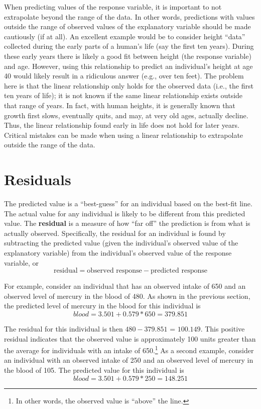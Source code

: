 \documentclass[10pt,openany]{book}\usepackage[]{graphicx}\usepackage[]{color}
\begin{document}
When predicting values of the response variable, it is important to not extrapolate beyond the range of the data. In other words, predictions with values outside the range of observed values of the explanatory variable should be made cautiously (if at all). An excellent example would be to consider height ``data'' collected during the early parts of a human's life (say the first ten years). During these early years there is likely a good fit between height (the response variable) and age. However, using this relationship to predict an individual's height at age 40 would likely result in a ridiculous answer (e.g., over ten feet). The problem here is that the linear relationship only holds for the observed data (i.e., the first ten years of life); it is not known if the same linear relationship exists outside that range of years. In fact, with human heights, it is generally known that growth first slows, eventually quits, and may, at very old ages, actually decline. Thus, the linear relationship found early in life does not hold for later years. Critical mistakes can be made when using a linear relationship to extrapolate outside the range of the data.

\section{Residuals}
The predicted value is a ``best-guess'' for an individual based on the best-fit line. The actual value for any individual is likely to be different from this predicted value. The \textbf{residual} is a measure of how ``far off'' the prediction is from what is actually observed. Specifically, the residual for an individual is found by subtracting the predicted value (given the individual's observed value of the explanatory variable) from the individual's observed value of the response variable, or
  \[ \text{residual}=\text{observed response}-\text{predicted response} \]

For example, consider an individual that has an observed intake of 650 and an observed level of mercury in the blood of 480. As shown in the previous section, the predicted level of mercury in the blood for this individual is
  \[ blood = 3.501 + 0.579*650 = 379.851 \]

The residual for this individual is then $480-379.851$ = $100.149$. This positive residual indicates that the observed value is approximately 100 units greater than the average for individuals with an intake of 650.\footnote{In other words, the observed value is ``above'' the line.}  As a second example, consider an individual with an observed intake of 250 and an observed level of mercury in the blood of 105. The predicted value for this individual is
  \[ blood = 3.501 + 0.579*250 = 148.251 \]
\end{document}
